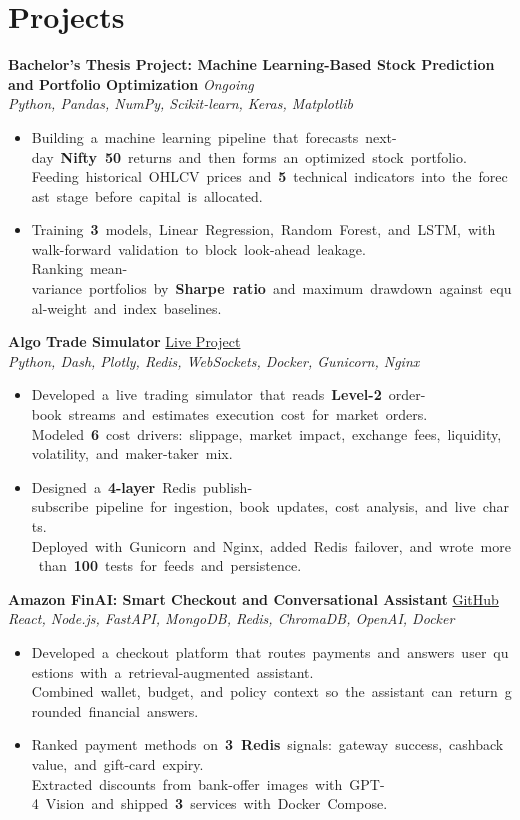 \documentclass[a4paper,10pt]{article}
\newcommand{\pairItem}[2]{\item \mbox{#1}\\\mbox{#2}}
\newcommand{\projectHeader}[4]{
  \textbf{#1} \hfill \href{#3}{#4}\\
  \textit{#2}
}
\newcommand{\ongoingHeader}[3]{
  \textbf{#1} \hfill \textit{#3}\\
  \textit{#2}
}
\begin{document}
\section{Projects}

\ongoingHeader
{Bachelor's Thesis Project: Machine Learning-Based Stock Prediction and Portfolio Optimization}
{Python, Pandas, NumPy, Scikit-learn, Keras, Matplotlib}
{Ongoing}

\begin{itemize}
  \pairItem
    {Building a machine learning pipeline that forecasts next-day \textbf{Nifty 50} returns and then forms an optimized stock portfolio.}
    {Feeding historical OHLCV prices and \textbf{5} technical indicators into the forecast stage before capital is allocated.}
  \pairItem
    {Training \textbf{3} models, Linear Regression, Random Forest, and LSTM, with walk-forward validation to block look-ahead leakage.}
    {Ranking mean-variance portfolios by \textbf{Sharpe ratio} and maximum drawdown against equal-weight and index baselines.}
\end{itemize}

\projectHeader
{Algo Trade Simulator}
{Python, Dash, Plotly, Redis, WebSockets, Docker, Gunicorn, Nginx}
{https://algo-trade-simulator-production.up.railway.app/}
{Live Project}

\begin{itemize}
  \pairItem
    {Developed a live trading simulator that reads \textbf{Level-2} order-book streams and estimates execution cost for market orders.}
    {Modeled \textbf{6} cost drivers: slippage, market impact, exchange fees, liquidity, volatility, and maker-taker mix.}
  \pairItem
    {Designed a \textbf{4-layer} Redis publish-subscribe pipeline for ingestion, book updates, cost analysis, and live charts.}
    {Deployed with Gunicorn and Nginx, added Redis failover, and wrote more than \textbf{100} tests for feeds and persistence.}
\end{itemize}

\projectHeader
{Amazon FinAI: Smart Checkout and Conversational Assistant}
{React, Node.js, FastAPI, MongoDB, Redis, ChromaDB, OpenAI, Docker}
{https://github.com/Prabhat-190/amazon-finai}
{GitHub}

\begin{itemize}
  \pairItem
    {Developed a checkout platform that routes payments and answers user questions with a retrieval-augmented assistant.}
    {Combined wallet, budget, and policy context so the assistant can return grounded financial answers.}
  \pairItem
    {Ranked payment methods on \textbf{3 Redis} signals: gateway success, cashback value, and gift-card expiry.}
    {Extracted discounts from bank-offer images with GPT-4 Vision and shipped \textbf{3} services with Docker Compose.}
\end{itemize}
\end{document}
